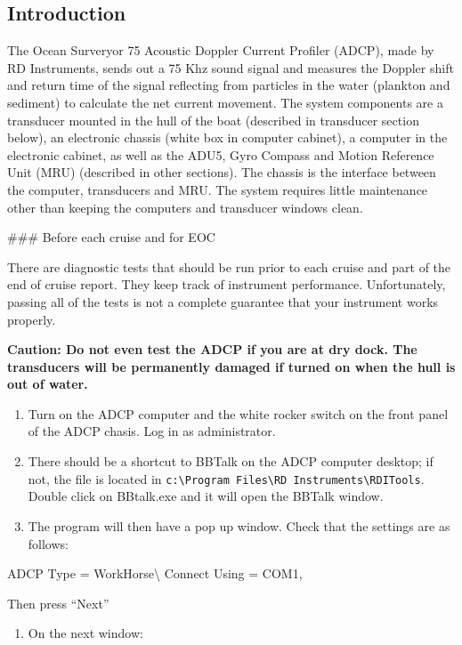 \documentclass[]{book}
\providecommand{\tightlist}{%
  \setlength{\itemsep}{0pt}\setlength{\parskip}{0pt}}
\theoremstyle{definition}
\theoremstyle{definition}
\theoremstyle{definition}
\theoremstyle{remark}
\begin{document}
\subsection{Introduction}\label{introduction}

The Ocean Surveryor 75 Acoustic Doppler Current Profiler (ADCP), made by
RD Instruments, sends out a 75 Khz sound signal and measures the Doppler
shift and return time of the signal reflecting from particles in the
water (plankton and sediment) to calculate the net current movement. The
system components are a transducer mounted in the hull of the boat
(described in transducer section below), an electronic chassis (white
box in computer cabinet), a computer in the electronic cabinet, as well
as the ADU5, Gyro Compass and Motion Reference Unit (MRU) (described in
other sections). The chassis is the interface between the computer,
transducers and MRU. The system requires little maintenance other than
keeping the computers and transducer windows clean.

\#\#\# Before each cruise and for EOC

There are diagnostic tests that should be run prior to each cruise and
part of the end of cruise report. They keep track of instrument
performance. Unfortunately, passing all of the tests is not a complete
guarantee that your instrument works properly.

\textbf{Caution: Do not even test the ADCP if you are at dry dock. The
transducers will be permanently damaged if turned on when the hull is
out of water.}

\begin{enumerate}
\def\labelenumi{\arabic{enumi}.}
\item
  Turn on the ADCP computer and the white rocker switch on the front
  panel of the ADCP chasis. Log in as administrator.
\item
  There should be a shortcut to BBTalk on the ADCP computer desktop; if
  not, the file is located in
  \texttt{c:\textbackslash{}Program\ Files\textbackslash{}RD\ Instruments\textbackslash{}RDITools}.
  Double click on BBtalk.exe and it will open the BBTalk window.
\item
  The program will then have a pop up window. Check that the settings
  are as follows:
\end{enumerate}

ADCP Type = WorkHorse\textbackslash{} Connect Using = COM1,

Then press ``Next''

\begin{enumerate}
\def\labelenumi{\arabic{enumi}.}
\setcounter{enumi}{3}
\tightlist
\item
  On the next window:
\end{enumerate}
\end{document}
